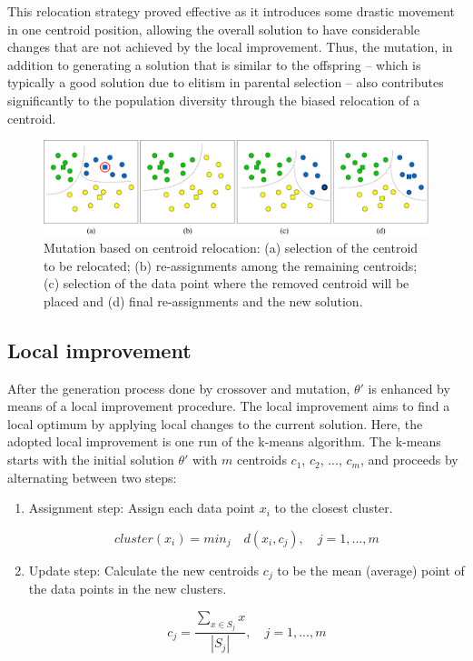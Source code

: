 This relocation strategy proved effective as it introduces some drastic movement in one centroid position, allowing the overall solution to have considerable changes that are not achieved by the local improvement. Thus, the mutation, in addition to generating a solution that is similar to the offspring -- which is typically a good solution due to elitism in parental selection -- also contributes significantly to the population diversity through the biased relocation of a centroid.

\begin{figure}[H]
  \begin{center}
    \includegraphics[width=1.0\textwidth]{img/mutation}
    \caption{Mutation based on centroid relocation: (a) selection of the centroid to be relocated; (b) re-assignments among the remaining centroids; (c) selection of the data point where the removed centroid will be placed and (d) final re-assignments and the new solution.}\label{fig:mutation}
  \end{center}
\end{figure}

\subsection{Local improvement}
\label{subsec:local-improvement}
After the generation process done by crossover and mutation, $\theta'$ is enhanced by means of a local improvement procedure. The local improvement aims to find a local optimum by applying local changes to the current solution. Here, the adopted local improvement is one run of the k-means algorithm. The k-means starts with the initial solution $\theta'$ with $m$ centroids $c_1$, $c_2$, ..., $c_m$, and proceeds by alternating between two steps:

\begin{enumerate}

	\item Assignment step: Assign each data point $x_i$ to the closest cluster.
	
	\begin{equation}
	cluster(x_i) = min_j \quad d(x_i, c_j), \quad j = 1,...,m
	\end{equation}
	
	\item Update step: Calculate the new centroids $c_j$ to be the mean (average) point of the data points in the new clusters.
	
	\begin{equation}
	c_j = \frac{\sum_{x \in S_j}x}{\left | S_j \right |}, \quad j = 1,...,m
	\end{equation}
		
\end{enumerate}

